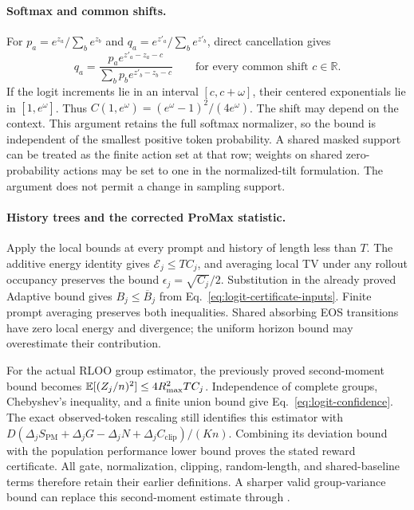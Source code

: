 \paragraph{Softmax and common shifts.}
For $p_a=e^{z_a}/\sum_b e^{z_b}$ and
$q_a=e^{z'_a}/\sum_b e^{z'_b}$, direct cancellation gives
\begin{equation*}
    q_a=\frac{p_ae^{z'_a-z_a-c}}{\sum_b p_be^{z'_b-z_b-c}}
    \qquad\text{for every common shift }c\in\mathbb R.
\end{equation*}
If the logit increments lie in an interval $[c,c+\omega]$, their
centered exponentials lie in $[1,e^\omega]$. Thus
$C(1,e^\omega)=(e^\omega-1)^2/(4e^\omega)$.
The shift may depend on the context. This argument retains the full
softmax normalizer, so the bound is independent of the smallest positive
token probability. A shared masked support can be treated as the finite
action set at that row; weights on shared zero-probability actions may be
set to one in the normalized-tilt formulation. The argument does not
permit a change in sampling support.

\paragraph{History trees and the corrected ProMax statistic.}
Apply the local bounds at every prompt and history of length less than
$T$. The additive energy identity gives $\mathcal E_j\le TC_j$,
and averaging local TV under any rollout occupancy preserves the bound
$\epsilon_j=\sqrt{C_j}/2$. Substitution in the already proved Adaptive
bound gives $B_j\le\overline B_j$ from
Eq.~\eqref{eq:logit-certificate-inputs}. Finite prompt averaging
preserves both inequalities. Shared absorbing EOS transitions have zero
local energy and divergence; the uniform horizon bound may overestimate
their contribution.

For the actual RLOO group estimator, the previously proved second-moment
bound becomes $\mathbb{E}[(Z_j/n)^2]\le4R_{\max}^2TC_j$.
Independence of complete groups, Chebyshev's inequality, and a finite union
bound give Eq.~\eqref{eq:logit-confidence}. The exact observed-token
rescaling still identifies this estimator with
$D(\Delta_jS_{\mathrm{PM}}+\Delta_jG-\Delta_jN+
\Delta_jC_{\mathrm{clip}})/(Kn)$.
Combining its deviation bound with the population performance lower bound
proves the stated reward certificate. All gate, normalization, clipping,
random-length, and shared-baseline terms therefore retain their earlier
definitions. A sharper valid group-variance bound can replace this
second-moment estimate through .

